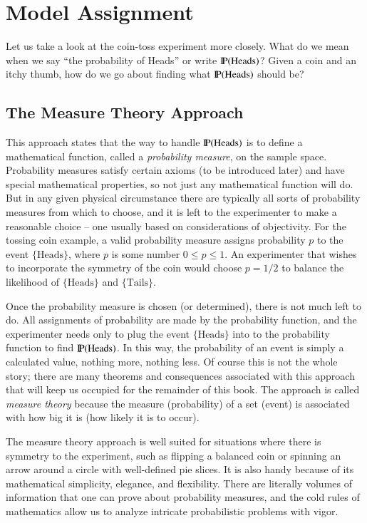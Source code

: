 \documentclass[captions=tableheading]{scrbook}
\begin{document}
\section{Model Assignment}
\label{sec-4-3}

\label{sec:Interpreting-Probabilities}

Let us take a look at the coin-toss experiment more closely. What do we mean when we say ``the probability of Heads'' or write \(\P(\mbox{Heads})\)? Given a coin and an itchy thumb, how do we go about finding what \(\P(\mbox{Heads})\) should be?
\subsection{The Measure Theory Approach}
\label{sec-4-3-1}


This approach states that the way to handle \(\P(\mbox{Heads})\) is to define a mathematical function, called a \emph{probability measure}, on the sample space. Probability measures satisfy certain axioms (to be introduced later) and have special mathematical properties, so not just any mathematical function will do. But in any given physical circumstance there are typically all sorts of probability measures from which to choose, and it is left to the experimenter to make a reasonable choice -- one usually based on considerations of objectivity. For the tossing coin example, a valid probability measure assigns probability \(p\) to the event \( \{ \mbox{Heads} \} \), where \(p\) is some number \(0\leq p\leq1\). An experimenter that wishes to incorporate the symmetry of the coin would choose \(p=1/2\) to balance the likelihood of \( \{\mbox{Heads} \} \) and \( \{ \mbox{Tails} \} \).

Once the probability measure is chosen (or determined), there is not much left to do. All assignments of probability are made by the probability function, and the experimenter needs only to plug the event \(\{ \mbox{Heads} \}\) into to the probability function to find \(\P(\mbox{Heads})\). In this way, the probability of an event is simply a calculated value, nothing more, nothing less. Of course this is not the whole story; there are many theorems and consequences associated with this approach that will keep us occupied for the remainder of this book. The approach is called \emph{measure theory} because the measure (probability) of a set (event) is associated with how big it is (how likely it is to occur).

The measure theory approach is well suited for situations where there is symmetry to the experiment, such as flipping a balanced coin or spinning an arrow around a circle with well-defined pie slices. It is also handy because of its mathematical simplicity, elegance, and flexibility. There are literally volumes of information that one can prove about probability measures, and the cold rules of mathematics allow us to analyze intricate probabilistic problems with vigor. 
\end{document}
